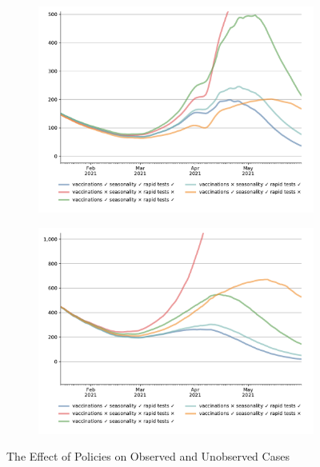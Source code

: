 \begin{figure}[ht]
  \centering
  \begin{subfigure}{.6\textwidth}
    \includegraphics[width=0.9 \textwidth]{../figures/results/figures/scenario_comparisons/one_off_and_combined/full_new_known_case_cropped}
  \end{subfigure}%
  \begin{subfigure}{.6\textwidth}
    \includegraphics[width=0.9 \textwidth]{../figures/results/figures/scenario_comparisons/one_off_and_combined/full_newly_infected_cropped}
  \end{subfigure}
  \caption{The Effect of Policies on Observed and Unobserved Cases}
  \label{fig:explain_decline}
  \figurenotes{\ldots}
\end{figure}



